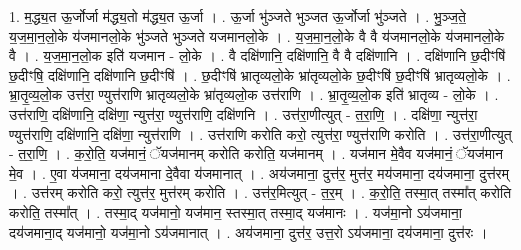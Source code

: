 \documentclass[17pt]{extarticle}
\begin{document}
1. म॒द्ध्य॒त ऊ॒र्जोर्जा म॑द्ध्य॒तो म॑द्ध्य॒त ऊ॒र्जा । . ऊ॒र्जा भु॑ञ्जते भुञ्जत ऊ॒र्जोर्जा भु॑ञ्जते । . भु॒ञ्ज॒ते॒ य॒ज॒मा॒न॒लो॒के य॑जमानलो॒के भु॑ञ्जते भुञ्जते यजमानलो॒के । . य॒ज॒मा॒न॒लो॒के वै वै य॑जमानलो॒के य॑जमानलो॒के वै । . य॒ज॒मा॒न॒लो॒क इति॑ यजमान - लो॒के । . वै दक्षि॑णानि॒ दक्षि॑णानि॒ वै वै दक्षि॑णानि । . दक्षि॑णानि छ॒दीꣳषि॑ छ॒दीꣳषि॒ दक्षि॑णानि॒ दक्षि॑णानि छ॒दीꣳषि॑ । . छ॒दीꣳषि॑ भ्रातृव्यलो॒के भ्रा॑तृव्यलो॒के छ॒दीꣳषि॑ छ॒दीꣳषि॑ भ्रातृव्यलो॒के । . भ्रा॒तृ॒व्य॒लो॒क उत्त॑रा॒ ण्युत्त॑राणि भ्रातृव्यलो॒के भ्रा॑तृव्यलो॒क उत्त॑राणि । . भ्रा॒तृ॒व्य॒लो॒क इति॑ भ्रातृव्य - लो॒के । . उत्त॑राणि॒ दक्षि॑णानि॒ दक्षि॑णा॒ न्युत्त॑रा॒ ण्युत्त॑राणि॒ दक्षि॑णनि । . उत्त॑रा॒णीत्युत् - त॒रा॒णि॒ । . दक्षि॑णा॒ न्युत्त॑रा॒ ण्युत्त॑राणि॒ दक्षि॑णानि॒ दक्षि॑णा॒ न्युत्त॑राणि । . उत्त॑राणि करोति करो॒ त्युत्त॑रा॒ ण्युत्त॑राणि करोति । . उत्त॑रा॒णीत्युत् - त॒रा॒णि॒ । . क॒रो॒ति॒ यज॑मानं॒ ॅयज॑मानम् करोति करोति॒ यज॑मानम् । . यज॑मान मे॒वैव यज॑मानं॒ ॅयज॑मान मे॒व । . ए॒वा य॑जमाना॒ दय॑जमाना दे॒वैवा य॑जमानात् । . अय॑जमाना॒ दुत्त॑र॒ मुत्त॑र॒ मय॑जमाना॒ दय॑जमाना॒ दुत्त॑रम् । . उत्त॑रम् करोति करो॒ त्युत्त॑र॒ मुत्त॑रम् करोति । . उत्त॑र॒मित्युत् - त॒र॒म् । . क॒रो॒ति॒ तस्मा॒त् तस्मा᳚त् करोति करोति॒ तस्मा᳚त् । . तस्मा॒द् यज॑मानो॒ यज॑मान॒ स्तस्मा॒त् तस्मा॒द् यज॑मानः । . यज॑मा॒नो ऽय॑जमाना॒ दय॑जमाना॒द् यज॑मानो॒ यज॑मा॒नो ऽय॑जमानात् । . अय॑जमाना॒ दुत्त॑र॒ उत्त॒रो ऽय॑जमाना॒ दय॑जमाना॒ दुत्त॑रः । \newline
\end{document}
